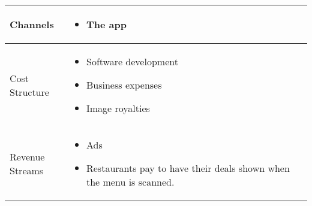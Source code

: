 \documentclass{article}[18pt]
\begin{document}
\begin{appendices}
\begin{center}
{\begin{tabular}{| m{0.2\linewidth} |m{0.8\linewidth}|}
\hline
Channels&
\begin{itemize}
	\item The app
\end{itemize}\\
\hline
Cost Structure&
\begin{itemize}
	\item Software development
	\item Business expenses
	\item Image royalties
\end{itemize}\\
\hline
Revenue Streams&
\begin{itemize}
	\item Ads
	\item Restaurants pay to have their deals shown when the menu is scanned.
\end{itemize}\\
\hline
\end{tabular}}
\end{center}


\end{appendices}
\end{document}
